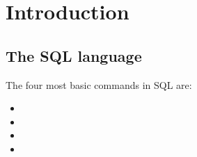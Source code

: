 %
%
%
\section{Introduction}

\subsection{The SQL language}

The four most basic commands in SQL are:

\begin{itemize}
    \item 
    \item 
    \item 
    \item 
\end{itemize}
